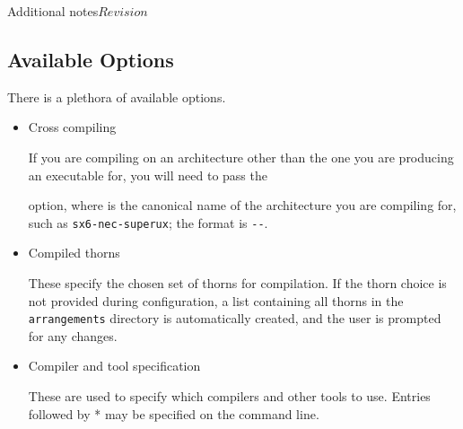\begin{cactuspart}{Additional notes}{}{$Revision$}
\subsection{Available Options}
\label{subsec:Compilation-Available_Options}

There is a plethora of available options.

\begin{itemize}

\item {Cross compiling}

If you are compiling on an architecture other than the one you are
producing an executable for, you will need to pass the

\begin{Lentry}
\item [\texttt{HOST\_MACHINE=\var{x-x-x}}]
\end{Lentry}
option, where \texttt{} is the canonical name of the architecture
you are compiling for, such as \texttt{sx6-nec-superux};  the format is
\texttt{--}.

\item {Compiled thorns}

These specify the chosen set of thorns for compilation. If the thorn choice is not provided
during configuration, a list containing all thorns in the
\texttt{arrangements} directory
is automatically created, and the user is prompted for any changes.


\item {Compiler and tool specification}

These are used to specify which compilers and other tools to use. Entries followed
by * may be specified on the command line.


\end{itemize}
\end{cactuspart}
